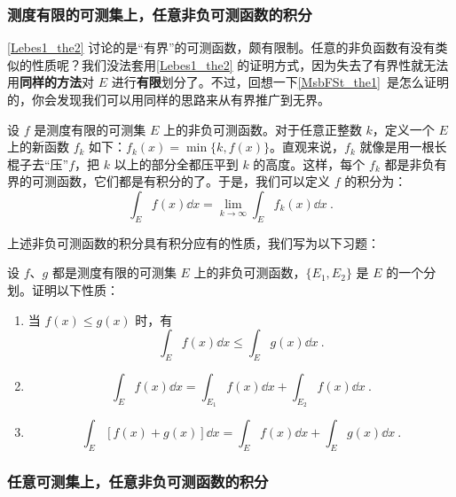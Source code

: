 \subsubsection{测度有限的可测集上，任意非负可测函数的积分}

\autoref{Lebes1_the2} 讨论的是“有界”的可测函数，颇有限制。任意的非负函数有没有类似的性质呢？我们没法套用\autoref{Lebes1_the2} 的证明方式，因为失去了有界性就无法用\textbf{同样的方法}对 $E$ 进行\textbf{有限}划分了。不过，回想一下\autoref{MsbFSt_the1}~是怎么证明的，你会发现我们可以用同样的思路来从有界推广到无界。

设 $f$ 是测度有限的可测集 $E$ 上的非负可测函数。对于任意正整数 $k$，定义一个 $E$ 上的新函数 $f_k$ 如下：$f_k(x)=\min \{k, f(x)\}$。直观来说，$f_k$ 就像是用一根长棍子去“压”$f$，把 $k$ 以上的部分全都压平到 $k$ 的高度。这样，每个 $f_k$ 都是非负有界的可测函数，它们都是有积分的了。于是，我们可以定义 $f$ 的积分为：
\begin{equation}
\int_E f(x) \dd x = \lim\limits_{k\to\infty} \int_E f_k(x) \dd x~.
\end{equation}

上述非负可测函数的积分具有积分应有的性质，我们写为以下习题：

\begin{exercise}{}\label{Lebes1_exe2}
设 $f$、$g$ 都是测度有限的可测集 $E$ 上的非负可测函数，$\{E_1, E_2\}$ 是 $E$ 的一个分划。证明以下性质：
\begin{enumerate}
\item 当 $f(x)\leq g(x)$ 时，有
\begin{equation}
\int_E f(x) \dd x\leq \int_E g(x) \dd x~.
\end{equation}
\item 
\begin{equation}
\int_E f(x) \dd x=\int_{E_1} f(x) \dd x+\int_{E_2} f(x) \dd x~.
\end{equation}
\item 
\begin{equation}
\int_E [f(x)+g(x)] \dd x = \int_E f(x) \dd x+\int_E g(x) \dd x~.
\end{equation}
\end{enumerate}

\end{exercise}




\subsubsection{任意可测集上，任意非负可测函数的积分}


